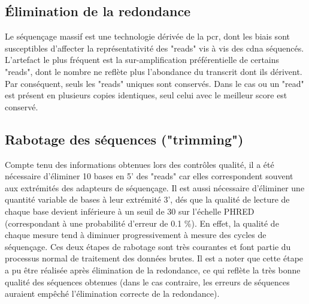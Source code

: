 \documentclass[../main.tex]{subfiles}
\begin{document}
\subsection{Élimination de la redondance}
Le séquençage massif est une technologie dérivée de la \gls{pcr}, dont les biais sont susceptibles d'affecter la représentativité des "reads" vis à vis des \gls{cdna} séquencés.
L'artefact le plus fréquent est la sur-amplification préférentielle de certains "reads", dont le nombre ne reflète plus l'abondance du transcrit dont ils dérivent.
Par conséquent, seuls les "reads" uniques sont conservés.
Dans le cas ou un "read" est présent en plusieurs copies identiques, seul celui avec le meilleur score est conservé.

\subsection{Rabotage des séquences ("trimming")}
Compte tenu des informations obtenues lors des contrôles qualité, il a été nécessaire d'éliminer 10 bases en 5’ des "reads" car elles correspondent souvent aux extrémités des adapteurs de séquençage.
Il est aussi nécessaire d'éliminer une quantité variable de bases à leur extrémité 3', dés que la qualité de lecture de chaque base devient inférieure à un seuil de 30 sur l'échelle PHRED (correspondant à une probabilité d'erreur de 0.1 \%).
En effet, la qualité de chaque mesure tend à diminuer progressivement à mesure des cycles de séquençage.
Ces deux étapes de rabotage sont très courantes et font partie du processus normal de traitement des données brutes.
Il est a noter que cette étape a pu être réalisée après élimination de la redondance, ce qui reflète la très bonne qualité des séquences obtenues (dans le cas contraire, les erreurs de séquences auraient empêché l'élimination correcte de la redondance).
\end{document}
